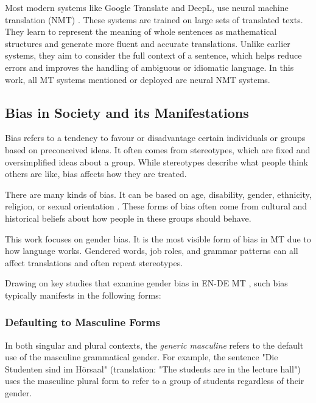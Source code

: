     Most modern systems like Google Translate and DeepL, use neural machine translation (NMT) \parencite{wuGooglesNeuralMachine2016,deeplHowDoesDeepL2021}. These systems are trained on large sets of translated texts. They learn to represent the meaning of whole sentences as mathematical structures and generate more fluent and accurate translations. Unlike earlier systems, they aim to consider the full context of a sentence, which helps reduce errors and improves the handling of ambiguous or idiomatic language. In this work, all MT systems mentioned or deployed are neural NMT systems.

\subsection{Bias in Society and its Manifestations}
\label{subsection:manifestations_of_gb}
    Bias refers to a tendency to favour or disadvantage certain individuals or groups based on preconceived ideas. It often comes from stereotypes, which are fixed and oversimplified ideas about a group. While stereotypes describe what people think others are like, bias affects how they are treated.

    There are many kinds of bias. It can be based on age, disability, gender, ethnicity, religion, or sexual orientation \parencite{ullmannGenderBiasMachine2022}. These forms of bias often come from cultural and historical beliefs about how people in these groups should behave. 

    This work focuses on gender bias. It is the most visible form of bias in MT due to how language works. Gendered words, job roles, and grammar patterns can all affect translations and often repeat stereotypes. 
    
    Drawing on key studies that examine gender bias in EN-DE MT \parencite{ullmannGenderBiasMachine2022,rescignoGenderBiasMachine2023,lardelliBuildingBridgesDataset2024,kapplAreAllSpanish2025}, such bias typically manifests in the following forms:

    \subsubsection{Defaulting to Masculine Forms}
        In both singular and plural contexts, the \textit{generic masculine} refers to the default use of the masculine grammatical gender.
        For example, the sentence "Die Studenten sind im Hörsaal" (translation: "The students are in the lecture hall") uses the masculine plural form to refer to a group of students regardless of their gender.

